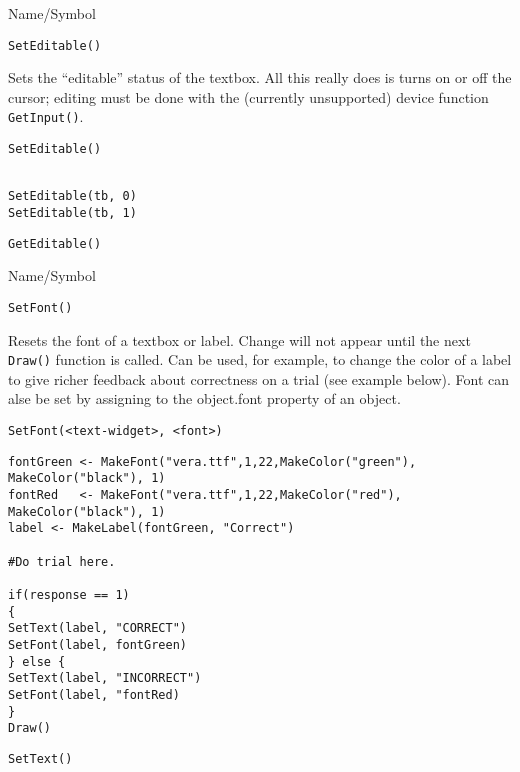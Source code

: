 \rl


\begin{desc}{Name/Symbol}
\item[Name/Symbol] 	\verb+SetEditable()+

\item[Description] Sets the ``editable'' status of the textbox.  All
  this really does is turns on or off the cursor; editing must be done
  with the (currently unsupported) device function \verb+GetInput()+.

\item[Usage] 
\begin{verbatim}
SetEditable()
\end{verbatim}

\item[Example]
\begin{verbatim}

SetEditable(tb, 0)
SetEditable(tb, 1)
\end{verbatim}

\item[See Also]    	\verb+GetEditable()+
\end{desc}

\rl


\begin{desc}{Name/Symbol}
\item[Name/Symbol] 	\verb+SetFont()+

\item[Description] Resets the font of a textbox or label.  Change will
  not appear until the next \verb+Draw()+ function is called.  Can be
  used, for example, to change the color of a label to give richer
  feedback about correctness on a trial (see example below).  Font can
alse be set by assigning to the object.font property of an object.

\item[Usage]
\begin{verbatim}
SetFont(<text-widget>, <font>)
\end{verbatim}

\item[Example]   	
\begin{verbatim}
fontGreen <- MakeFont("vera.ttf",1,22,MakeColor("green"),
MakeColor("black"), 1)
fontRed   <- MakeFont("vera.ttf",1,22,MakeColor("red"),
MakeColor("black"), 1)
label <- MakeLabel(fontGreen, "Correct")

#Do trial here.       	

if(response == 1)
{
SetText(label, "CORRECT")
SetFont(label, fontGreen)
} else {
SetText(label, "INCORRECT")
SetFont(label, "fontRed)
}
Draw()
\end{verbatim}

\item[See Also]    	\verb+SetText()+
\end{desc}


